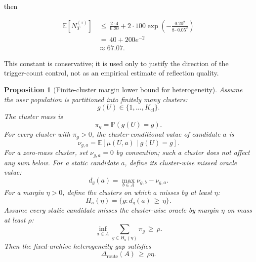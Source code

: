 \documentclass{article} %
\newtheorem{proposition}[theorem]{Proposition}
\begin{document}
then

\begin{align}
\label{eq:app-fifth-trigger-example}
\mathbb{E}[N_T^{(\tau)}]
&\,\le\,
\frac{2\cdot 4}{0.20}
+
2\cdot 100\exp\!\left(
-\frac{0.20^2}{8\cdot 0.05^2}
\right)
\\
&\,=\,
40+200e^{-2}
\\
&\approx
67.07.
\end{align}

This constant is conservative; it is used only to justify the direction of the trigger-count control, not as an empirical estimate of reflection quality.

\begin{proposition}[Finite-cluster margin lower bound for heterogeneity]
\label{prop:13}
Assume the user population is partitioned into finitely many clusters:
\begin{equation}
\label{eq:app-fifth-cluster-set}
g(U)\in\{1,\ldots,K_{\mathrm{cl}}\}.
\end{equation}
The cluster mass is
\begin{equation}
\label{eq:app-fifth-cluster-mass}
\pi_g
=
\mathbb{P}(g(U)=g).
\end{equation}
For every cluster with $\pi_g>0$, the cluster-conditional value of candidate \(a\) is
\begin{equation}
\label{eq:app-fifth-cluster-value}
\nu_{g,a}
=
\mathbb{E}[\mu(U,a)\mid g(U)=g].
\end{equation}
For a zero-mass cluster, set $\nu_{g,a}=0$ by convention; such a cluster does
not affect any sum below.
For a static candidate \(a\), define its cluster-wise missed oracle value:
\begin{equation}
\label{eq:app-fifth-missed-value}
d_g(a)
=
\max_{b\in A}\nu_{g,b}
-
\nu_{g,a}.
\end{equation}
For a margin \(\eta>0\), define the clusters on which \(a\) misses by at least \(\eta\):
\begin{equation}
\label{eq:app-fifth-margin-set}
H_a(\eta)
=
\{g:d_g(a)\,\ge\, \eta\}.
\end{equation}
Assume every static candidate misses the cluster-wise oracle by margin \(\eta\) on mass at least \(\rho\):
\begin{equation}
\label{eq:app-fifth-margin-condition}
\inf_{a\in A}
\sum_{g\in H_a(\eta)}\pi_g
\,\ge\,
\rho.
\end{equation}
Then the fixed-archive heterogeneity gap satisfies
\begin{equation}
\label{eq:app-fifth-margin-gap}
\Delta_{\mathrm{route}}(A)
\,\ge\,
\rho\eta.
\end{equation}
\end{proposition}
\end{document}
